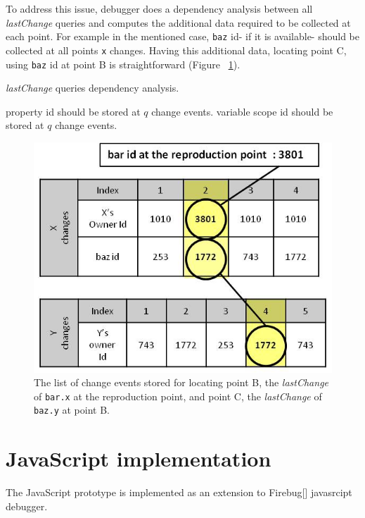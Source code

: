 \documentclass[preprint]{sigplanconf}
\begin{document}
To address this issue, debugger does a dependency analysis between all \textit{lastChange} queries and computes the additional data required to be collected at each point. For example in the mentioned case, \texttt{baz} id- if it is available- should be collected at all points \texttt{x} changes. Having this additional data, locating point C, using \texttt{baz} id at point B is straightforward (Figure ~\ref{fig:lastchange-lastchange}).

\begin{algorithm}
\caption{\textit{lastChange} queries dependency analysis.}
\label{dependency-analysis}
\begin{algorithmic}

     \STATE property id should be stored at $q$ change events. 
     \STATE variable scope id should be stored at $q$ change events.
	 \ENDIF 
 \ENDFOR 
\ENDFOR

\end{algorithmic}
\end{algorithm}

\begin{figure}[htp]
\includegraphics[width=.48\textwidth]{8-lastchange-lastchange.jpg}
\caption{The list of change events stored for locating point B, the \textit{lastChange} of \texttt{bar.x} at the reproduction point, and point C, the \textit{lastChange} of  \texttt{baz.y} at point B.}
\label{fig:lastchange-lastchange}
\end{figure}




\section{JavaScript implementation}
The JavaScript prototype is implemented as an extension to Firebug[] javasrcipt debugger. 
\end{document}
